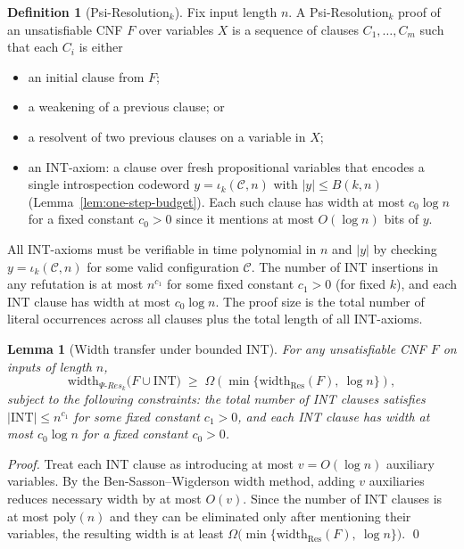 \documentclass[11pt]{article}
\newtheorem{lemma}[theorem]{Lemma}
\theoremstyle{definition}
\newtheorem{definition}[theorem]{Definition}
\begin{document}
\begin{definition}[Psi-Resolution$_k$]
Fix input length $n$. A Psi-Resolution$_k$ proof of an unsatisfiable CNF $F$ over variables $X$ is a sequence of clauses $C_1,\ldots,C_m$ such that each $C_i$ is either
\begin{itemize}
  \item an initial clause from $F$;
  \item a weakening of a previous clause; or
  \item a resolvent of two previous clauses on a variable in $X$;
  \item an INT-axiom: a clause over fresh propositional variables that encodes a single introspection codeword $y=\iota_k(\mathcal{C},n)$ with $|y|\le B(k,n)$ (Lemma~\ref{lem:one-step-budget}). Each such clause has width at most $c_0\log n$ for a fixed constant $c_0>0$ since it mentions at most $O(\log n)$ bits of $y$.
\end{itemize}
All INT-axioms must be verifiable in time polynomial in $n$ and $|y|$ by checking $y=\iota_k(\mathcal{C},n)$ for some valid configuration $\mathcal{C}$. The number of INT insertions in any refutation is at most $n^{c_1}$ for some fixed constant $c_1>0$ (for fixed $k$), and each INT clause has width at most $c_0\log n$. The proof size is the total number of literal occurrences across all clauses plus the total length of all INT-axioms.
\end{definition}

\begin{lemma}[Width transfer under bounded INT]
\label{lem:psi-res-width}
For any unsatisfiable CNF $F$ on inputs of length $n$,
\[
\mathrm{width}_{\Psi\text{-}Res_k}\big(F\cup \mathrm{INT}\big) \;\ge\; \Omega\!\left( \min\{\mathrm{width}_{\mathrm{Res}}(F),\ \log n\}\right),
\]
subject to the following constraints: the total number of INT clauses satisfies $|\mathrm{INT}|\le n^{c_1}$ for some fixed constant $c_1>0$, and each INT clause has width at most $c_0\log n$ for a fixed constant $c_0>0$.
\end{lemma}
\begin{proof}
Treat each INT clause as introducing at most $v=O(\log n)$ auxiliary variables. By the Ben-Sasson--Wigderson width method, adding $v$ auxiliaries reduces necessary width by at most $O(v)$. Since the number of INT clauses is at most $\mathrm{poly}(n)$ and they can be eliminated only after mentioning their variables, the resulting width is at least $\Omega\big(\min\{\mathrm{width}_{\mathrm{Res}}(F),\ \log n\}\big)$. \qed
\end{proof}
\end{document}
